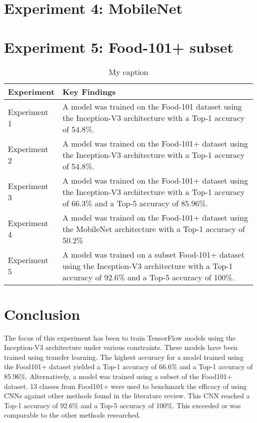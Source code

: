 \section{Experiment 4: MobileNet}
\label{mobilenet}


\section{Experiment 5: Food-101+ subset}
\label{subset}


\begin{table}[]
\centering
\caption{My caption}
\label{my-label}
\begin{tabular}{|p{3.5cm}|p{9cm}|}
\hline
\textbf{Experiment}                               & \textbf{Key Findings}                                                                                                                                \\ \hline
Experiment 1 & A model was trained on the Food-101 dataset using the Inception-V3 architecture with a Top-1 accuracy of 54.8\%.                                     \\ \hline
Experiment 2       & A model was trained on the Food-101+ dataset using the Inception-V3 architecture with a Top-1 accuracy of 54.8\%.                                    \\ \hline
Experiment 3       & A model was trained on the Food-101+ dataset using the Inception-V3 architecture with a Top-1 accuracy of 66.3\% and a Top-5 accuracy of 85.96\%.    \\ \hline
Experiment 4                          & A model was trained on the Food-101+ dataset using the MobileNet architecture with a Top-1 accuracy of 50.2\%                                        \\ \hline
Experiment 5              & A model was trained on a subset Food-101+ dataset using the Inception-V3 architecture with a Top-1 accuracy of 92.6\% and a Top-5 accuracy of 100\%. \\ \hline
\end{tabular}
\end{table}

\section{Conclusion}
The focus of this experiment has been to train TensorFlow models using the Inception-V3 architecture under various constraints.
These models have been trained using transfer learning.
The highest accuracy for a model trained using the Food101+ dataset yielded a Top-1 accuracy of 66.6\% and a Top-1 accuracy of 85.96\%.
Alternatively, a model was trained using a subset of the Food101+ dataset.
13 classes from Food101+ were used to benchmark the efficacy of using CNNs against other methods found in the literature review.
This CNN reached a Top-1 accuracy of 92.6\% and a Top-5 accuracy of 100\%.
This exceeded or was comparable to the other methods researched.

